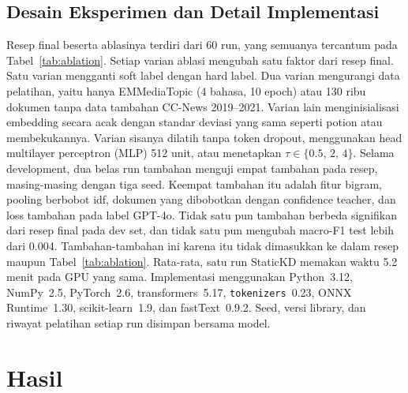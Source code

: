 \documentclass[journal]{IEEEtran}
\begin{document}
\subsection{Desain Eksperimen dan Detail Implementasi}
\label{sec:design}
Resep final beserta ablasinya terdiri dari 60 run, yang semuanya tercantum pada Tabel~\ref{tab:ablation}. Setiap varian ablasi mengubah satu faktor dari resep final. Satu varian mengganti soft label dengan hard label. Dua varian mengurangi data pelatihan, yaitu hanya EMMediaTopic (4 bahasa, 10 epoch) atau 130 ribu dokumen tanpa data tambahan CC-News 2019--2021. Varian lain menginisialisasi embedding secara acak dengan standar deviasi yang sama seperti potion atau membekukannya. Varian sisanya dilatih tanpa token dropout, menggunakan head multilayer perceptron (MLP) 512 unit, atau menetapkan $\tau\in\{0.5,\,2,\,4\}$. Selama development, dua belas run tambahan menguji empat tambahan pada resep, masing-masing dengan tiga seed. Keempat tambahan itu adalah fitur bigram, pooling berbobot idf, dokumen yang dibobotkan dengan confidence teacher, dan loss tambahan pada label GPT-4o. Tidak satu pun tambahan berbeda signifikan dari resep final pada dev set, dan tidak satu pun mengubah macro-F1 test lebih dari 0.004. Tambahan-tambahan ini karena itu tidak dimasukkan ke dalam resep maupun Tabel~\ref{tab:ablation}. Rata-rata, satu run StaticKD memakan waktu 5.2 menit pada GPU yang sama. Implementasi menggunakan Python~3.12, NumPy~2.5, PyTorch~2.6, transformers~5.17, \texttt{tokenizers}~0.23, ONNX Runtime~1.30, scikit-learn~1.9, dan fastText~0.9.2. Seed, versi library, dan riwayat pelatihan setiap run disimpan bersama model.

\section{Hasil}
\label{sec:results}
\end{document}
